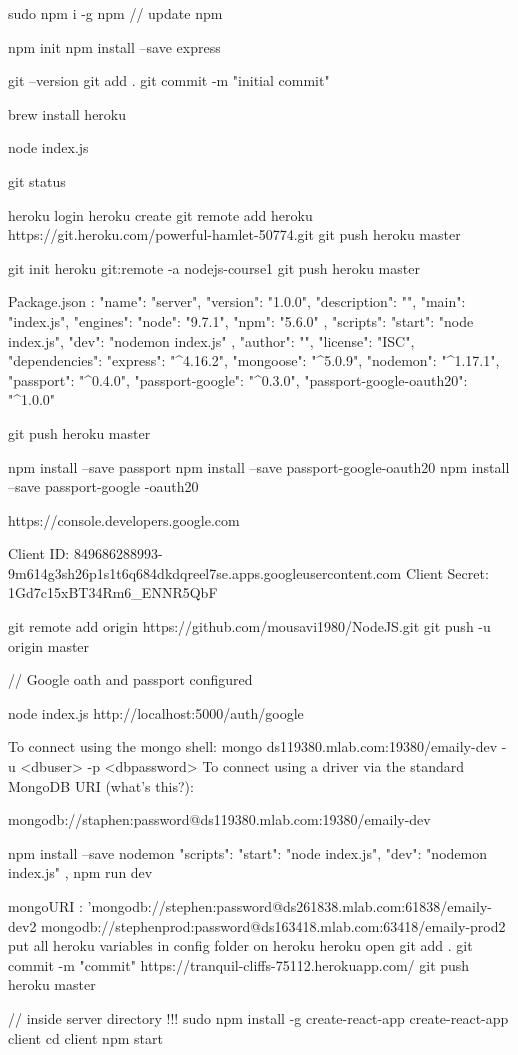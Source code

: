 


sudo npm i -g npm  // update npm

npm init
npm install --save express

git --version
git add .
git commit -m "initial commit"

brew install heroku

node index.js

git status

heroku login
heroku create
git remote add heroku https://git.heroku.com/powerful-hamlet-50774.git
git push heroku master

git init
heroku git:remote -a nodejs-course1
git push heroku master

Package.json :
{
	"name": "server",
	"version": "1.0.0",
	"description": "",
	"main": "index.js",
	"engines": {
		"node": "9.7.1",
		"npm": "5.6.0"
	},
	"scripts": {
		"start": "node index.js",
		"dev": "nodemon index.js"
	},
	"author": "",
	"license": "ISC",
	"dependencies": {
		"express": "^4.16.2",
		"mongoose": "^5.0.9",
		"nodemon": "^1.17.1",
		"passport": "^0.4.0",
		"passport-google": "^0.3.0",
		"passport-google-oauth20": "^1.0.0"
	}
}


git push heroku master

npm install --save passport 
npm install --save passport-google-oauth20
npm install --save passport-google -oauth20


https://console.developers.google.com

Client ID: 849686288993-9m614g3sh26p1s1t6q684dkdqreel7se.apps.googleusercontent.com
Client Secret: 1Gd7c15xBT34Rm6_ENNR5QbF

git remote add origin https://github.com/mousavi1980/NodeJS.git
git push -u origin master

// Google oath and passport configured

node index.js
http://localhost:5000/auth/google

To connect using the mongo shell:
mongo ds119380.mlab.com:19380/emaily-dev -u <dbuser> -p <dbpassword>
To connect using a driver via the standard MongoDB URI (what's this?):

mongodb://staphen:password@ds119380.mlab.com:19380/emaily-dev

npm install --save nodemon
"scripts": {
	"start": "node index.js",
	"dev": "nodemon index.js"
},
npm run dev

mongoURI : 'mongodb://stephen:password@ds261838.mlab.com:61838/emaily-dev2
mongodb://stephenprod:password@ds163418.mlab.com:63418/emaily-prod2
put all heroku variables in config folder on heroku
heroku open
git add .
git commit -m "commit"
https://tranquil-cliffs-75112.herokuapp.com/
git push heroku master


// inside server directory !!!
sudo npm install -g create-react-app
create-react-app client
cd client
npm start
 

